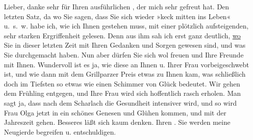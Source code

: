 \begin{ledgroupsized}[t]{13cm}
           \pstart{}Lieber,\pend\pstart
           danke sehr für Ihren ausführlichen \label{K_L03491-1v}\label{K_L03491-1h}, der mich sehr gefreut hat. Den letzten Satz, da wo Sie sagen, dass Sie sich
               wieder »keck mitten ins Leben« u. s. w. habe ich, wie ich Ihnen gestehen muss, mit
               einer plötzlich aufsteigenden, sehr starken Ergriffenheit gelesen. Denn aus ihm sah
               ich erst ganz deutlich, \uline{wo} Sie in dieser letzten Zeit
               mit Ihren Gedanken und Sorgen gewesen sind, und was Sie durchgemacht haben. Nun aber
               dürfen Sie sich wol freuen und Ihre Freunde mit Ihnen. Wundervoll ist es ja, wie
               diese \label{K_L03491-2v}\label{K_L03491-2h} an Ihnen u. Ihrer Frau vorbeigeschwebt ist, und wie dann mit dem Grillparzer Preis etwas zu Ihnen kam, was schließlich doch im
               Tiefsten so etwas wie einen Schimmer von Glück bedeutet. Wir gehen dem Frühling
               entgegen, und Ihre Frau wird
               sich hoffentlich rasch erholen. Man sagt ja, dass nach dem Scharlach die Gesundheit
               intensiver wird, und so wird Frau Olga jetzt in
               ein schönes Genesen und Glühen kommen, und mit der Jahreszeit gehen. Besseres läßt
               sich kaum denken. Ihren \label{K_L03491-3v}\label{K_L03491-3h}. Sie werden meine Neugierde begreifen u. entschuldigen. \label{K_L03491-4v}
\end{ledgroupsized}
